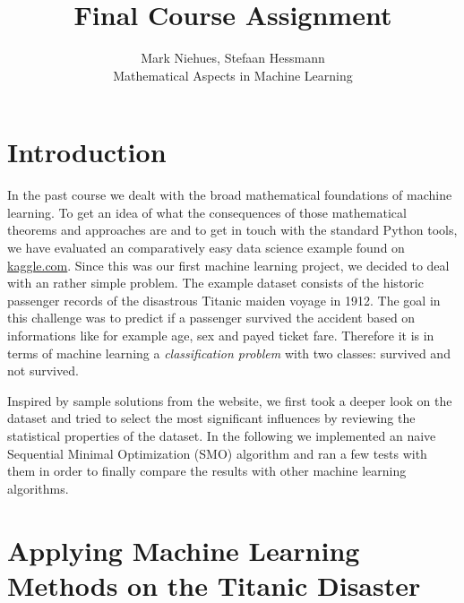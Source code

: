 
\renewcommand{\arraystretch}{1.2} %
\usepackage{array} %


 
\title{Final Course Assignment \\ }%
\author{Mark Niehues, Stefaan Hessmann \\ %
Mathematical Aspects in Machine Learning} %

\maketitle
 
\section{Introduction}
In the past course we dealt with the broad mathematical foundations of machine learning. To get an idea of what the consequences of those mathematical theorems and approaches are and to get in touch with the standard Python tools, we have evaluated an comparatively easy data science example found on \url{kaggle.com}. Since this was our first machine learning project, we decided to deal with an rather simple problem. The example dataset \cite{Kaggle2017} consists of the historic passenger records of the disastrous Titanic maiden voyage in 1912. The goal in this challenge was to predict if a passenger survived the accident based on informations like for example age, sex and payed ticket fare. Therefore it is in terms of machine learning a \textit{classification problem} with two classes: survived and not survived.

Inspired by sample solutions from the website, we first took a deeper look on the dataset and tried to select the most significant influences by reviewing the statistical properties of the dataset. In the following we implemented an naive Sequential Minimal Optimization (SMO) algorithm and ran a few tests with them in order to finally compare the results with other machine learning algorithms.

\section{Applying Machine Learning Methods on the Titanic Disaster}
